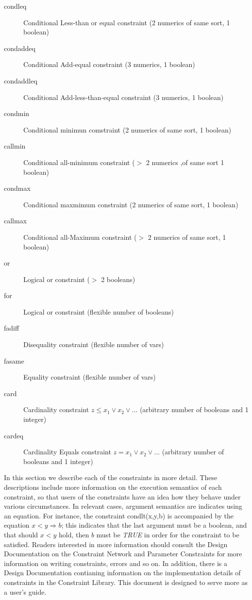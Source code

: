 \begin{description}
\item[condleq]{Conditional Less-than or equal constraint (2 numerics of same sort, 1 boolean)}
\item[condaddeq]{Conditional Add-equal constraint (3 numerics, 1 boolean)}
\item[condaddleq]{Conditional Add-less-than-equal constraint (3 numerics, 1 boolean)}

\item[condmin]{Conditional minimun comstraint (2 numerics of same sort, 1 boolean)}
\item[callmin]{Conditional all-minimum constraint ($>$ 2 numerics ,of same sort 1 boolean)}

\item[condmax]{Conditional maxmimum constraint (2 numerics of same sort, 1 boolean)}
\item[callmax]{Conditional all-Maximum constraint ($>$ 2 numerics of same sort, 1 boolean)}

\item[or]{Logical or constraint ($>$ 2 booleans)}

\item[for]{Logical or constraint (flexible number of booleans)}
\item[fadiff]{Disequality constraint (flexible number of vars)}
\item[fasame]{Equality constraint (flexible number of vars)}

\item[card]{Cardinality constraint $z \leq x_1 \vee x_2 \vee...$  (arbitrary number of booleans and 1 integer)}
\item[cardeq]{Cardinality Equals constraint $z = x_1 \vee x_2 \vee...$  (arbitrary number of booleans and 1 integer)}

\end{description}

In this section we describe each of the constraints in more detail.
These descriptions include more information on the execution semantics
of each constraint, so that users of the constraints have an idea how
they behave under various circumstances.  In relevant cases, argument
semantics are indicates using an equation.  For instance, the constraint
condlt(x,y,b) is accompanied by the equation $x<y \Rightarrow b$; this indicates
that the last argument must be a boolean, and that should $x<y$ hold, then
$b$ must be {\em TRUE} in order for the constraint to be satisfied.
Readers interested in more
information should consult the Design Documentation on the Constraint
Network and Parameter Constraints for more information on writing
constraints, errors and so on.  In addition, there is a Design
Documentation contianing information on the implementation details
of constraints in the Constraint Library.  This document is designed
to serve more as a user's guide.


